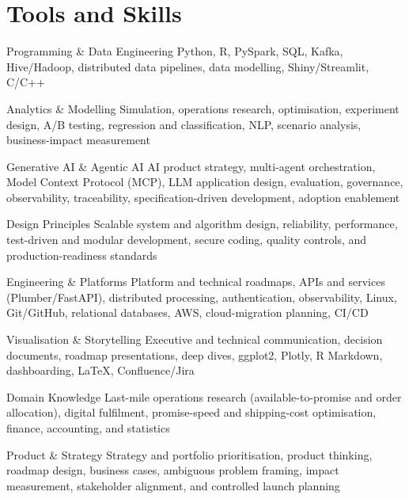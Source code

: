 \documentclass[11pt,a4paper]{moderncv}
\begin{document}
\hypertarget{tools-and-skills}{
\section{Tools and Skills}\label{tools-and-skills}}

\nopagebreak
    {Programming \& Data Engineering}
    {Python, R, PySpark, SQL, Kafka, Hive/Hadoop, distributed data pipelines, data modelling, Shiny/Streamlit, C/C++}
    {}{}{}

    {Analytics \& Modelling}
    {Simulation, operations research, optimisation, experiment design, A/B testing, regression and classification, NLP, scenario analysis, business-impact measurement}
    {}{}{}

    {Generative AI \& Agentic AI}
    {AI product strategy, multi-agent orchestration, Model Context Protocol (MCP), LLM application design, evaluation, governance, observability, traceability, specification-driven development, adoption enablement}
    {}{}{}

    {Design Principles}
    {Scalable system and algorithm design, reliability, performance, test-driven and modular development, secure coding, quality controls, and production-readiness standards}
    {}{}{}

    {Engineering \& Platforms}
    {Platform and technical roadmaps, APIs and services (Plumber/FastAPI), distributed processing, authentication, observability, Linux, Git/GitHub, relational databases, AWS, cloud-migration planning, CI/CD}
    {}{}{}

    {Visualisation \& Storytelling}
    {Executive and technical communication, decision documents, roadmap presentations, deep dives, ggplot2, Plotly, R Markdown, dashboarding, LaTeX, Confluence/Jira}
    {}{}{}

    {Domain Knowledge}
    {Last-mile operations research (available-to-promise and order allocation), digital fulfilment, promise-speed and shipping-cost optimisation, finance, accounting, and statistics}
    {}{}{}

    {Product \& Strategy}
    {Strategy and portfolio prioritisation, product thinking, roadmap design, business cases, ambiguous problem framing, impact measurement, stakeholder alignment, and controlled launch planning}
    {}{}{}
\end{document}
